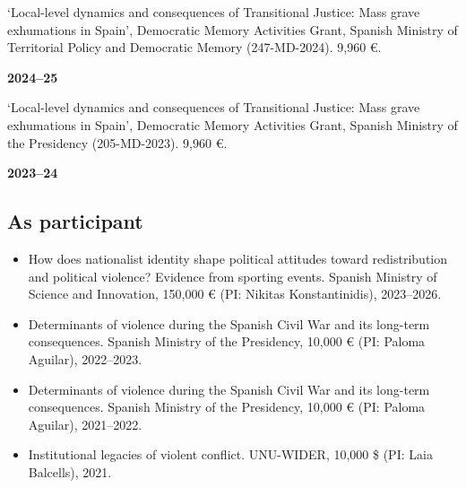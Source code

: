 \documentclass[a4paper, 12pt]{article}
\begin{document}
\begin{minipage}[t]{0.87\textwidth}
`Local-level dynamics and consequences of Transitional Justice: Mass grave exhumations in Spain', Democratic Memory Activities Grant, Spanish Ministry of Territorial Policy and Democratic Memory (247-MD-2024). 9,960 €.\\\vspace{-8pt} %
\end{minipage}\hfill\begin{minipage}[t]{0.1\textwidth}
\flushright
\textbf{2024--25}
\end{minipage}\vspace{5pt}
\begin{minipage}[t]{0.87\textwidth}
`Local-level dynamics and consequences of Transitional Justice: Mass grave exhumations in Spain', Democratic Memory Activities Grant, Spanish Ministry of the Presidency (205-MD-2023). 9,960 €.\\\vspace{-8pt} %
\end{minipage}\hfill\begin{minipage}[t]{0.1\textwidth}
\flushright
\textbf{2023--24}
\end{minipage}

\subsection*{As participant}

\begin{itemize}[leftmargin=12pt, itemsep=0pt]
	\item How does nationalist identity shape political attitudes toward redistribution and political violence? Evidence from sporting events. Spanish Ministry of Science and Innovation, 150,000 € (PI: Nikitas Konstantinidis), 2023--2026. %
	\item Determinants of violence during the Spanish Civil War and its long-term consequences. Spanish Ministry of the Presidency, 10,000 € (PI: Paloma Aguilar), 2022--2023. %
	\item Determinants of violence during the Spanish Civil War and its long-term consequences. Spanish Ministry of the Presidency, 10,000 € (PI: Paloma Aguilar), 2021--2022. %
	\item Institutional legacies of violent conflict. UNU-WIDER, 10,000 \$ (PI: Laia Balcells), 2021.
\end{itemize}
\end{document}

